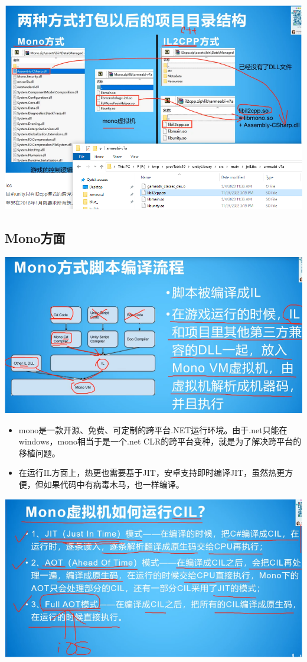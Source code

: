 \documentclass[9pt, b5paper]{article}
\begin{document}
\includegraphics[width=.9\linewidth]{./pic/notes_20221125_094114.png}
\subsection{Mono方面}
\label{sec-5-1}

\includegraphics[width=.9\linewidth]{./pic/notes_20221125_094154.png}
\begin{itemize}
\item mono是一款开源、免费、可定制的跨平台.NET运行环境。由于.net只能在windows，mono相当于是一个.net CLR的跨平台变种，就是为了解决跨平台的移植问题。
\item 在运行IL方面上，热更也需要基于JIT，安卓支持即时编译JIT，虽然热更方便，但如果代码中有病毒木马，也一样编译。
\end{itemize}

\includegraphics[width=.9\linewidth]{./pic/notes_20221125_094222.png}
\end{document}
